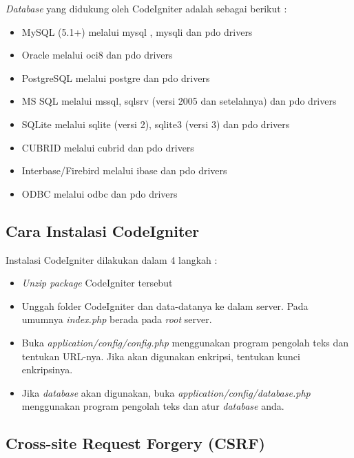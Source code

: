 \textit{Database} yang didukung oleh CodeIgniter adalah sebagai berikut :
\begin{itemize}
	\item MySQL (5.1+) melalui mysql , mysqli dan pdo drivers
	\item Oracle melalui oci8 dan pdo drivers
	\item PostgreSQL melalui postgre dan pdo drivers
	\item MS SQL melalui mssql, sqlsrv (versi 2005 dan setelahnya) dan pdo drivers
	\item SQLite melalui sqlite (versi 2), sqlite3 (versi 3) dan pdo drivers
	\item CUBRID melalui cubrid dan pdo drivers
	\item Interbase/Firebird melalui ibase dan pdo drivers
	\item ODBC melalui odbc dan pdo drivers
\end{itemize}

\subsection{Cara Instalasi CodeIgniter}
Instalasi CodeIgniter dilakukan dalam 4 langkah :
\begin{itemize}
	\item \textit{Unzip package} CodeIgniter tersebut
	\item Unggah folder CodeIgniter dan data-datanya ke dalam server. Pada umumnya \textit{index.php} berada pada \textit{root} server.
	\item Buka \textit{application/config/config.php} menggunakan program pengolah teks dan tentukan URL-nya. Jika akan digunakan enkripsi, tentukan kunci enkripsinya.
	\item Jika \textit{database} akan digunakan, buka \textit{application/config/database.php} menggunakan program pengolah teks dan atur \textit{database} anda.
\end{itemize}

\subsection{Cross-site Request Forgery (CSRF) }
